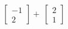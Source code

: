 \documentclass[preview]{standalone}
\begin{document}
\begin{align*}
\begin{bmatrix}-1\\2\end{bmatrix}+\
                \begin{bmatrix}2\\1\end{bmatrix}\\
\end{align*}
\end{document}
